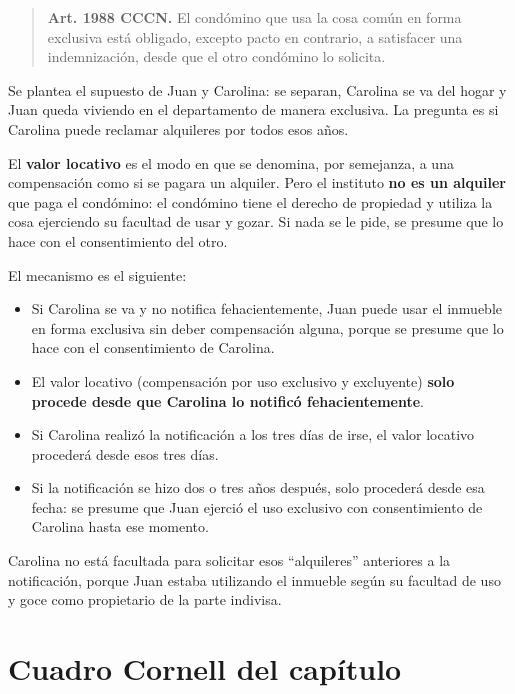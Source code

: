 \documentclass[12pt,oneside]{book}
\begin{document}
\begin{quote}
\textbf{Art. 1988 CCCN.} El condómino que usa la cosa común en forma exclusiva está obligado, excepto pacto en contrario, a satisfacer una indemnización, desde que el otro condómino lo solicita.
\end{quote}

Se plantea el supuesto de Juan y Carolina: se separan, Carolina se va del hogar y Juan queda viviendo en el departamento de manera exclusiva. La pregunta es si Carolina puede reclamar alquileres por todos esos años.

\begin{important}
El \textbf{valor locativo} es el modo en que se denomina, por semejanza, a una compensación como si se pagara un alquiler. Pero el instituto \textbf{no es un alquiler} que paga el condómino: el condómino tiene el derecho de propiedad y utiliza la cosa ejerciendo su facultad de usar y gozar. Si nada se le pide, se presume que lo hace con el consentimiento del otro.
\end{important}

El mecanismo es el siguiente:

\begin{itemize}
    \item Si Carolina se va y no notifica fehacientemente, Juan puede usar el inmueble en forma exclusiva sin deber compensación alguna, porque se presume que lo hace con el consentimiento de Carolina.
    \item El valor locativo (compensación por uso exclusivo y excluyente) \textbf{solo procede desde que Carolina lo notificó fehacientemente}.
    \item Si Carolina realizó la notificación a los tres días de irse, el valor locativo procederá desde esos tres días.
    \item Si la notificación se hizo dos o tres años después, solo procederá desde esa fecha: se presume que Juan ejerció el uso exclusivo con consentimiento de Carolina hasta ese momento.
\end{itemize}

Carolina no está facultada para solicitar esos ``alquileres'' anteriores a la notificación, porque Juan estaba utilizando el inmueble según su facultad de uso y goce como propietario de la parte indivisa.

\section{Cuadro Cornell del capítulo}
\end{document}
